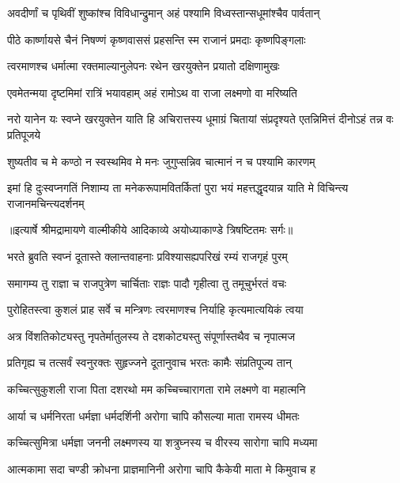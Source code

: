 \twolineshloka
{अवदीर्णां च पृथिवीं शुष्कांश्च विविधान्द्रुमान्}
{अहं पश्यामि विध्वस्तान्सधूमांश्चैव पार्वतान्} %

\twolineshloka
{पीठे कार्ष्णायसे चैनं निषण्णं कृष्णवाससं}
{प्रहसन्ति स्म राजानं प्रमदाः कृष्णपिङ्गलाः} %

\twolineshloka
{त्वरमाणश्च धर्मात्मा रक्तमाल्यानुलेपनः}
{रथेन खरयुक्तेन प्रयातो दक्षिणामुखः} %

\twolineshloka
{एवमेतन्मया दृष्टमिमां रात्रिं भयावहाम्}
{अहं रामोऽथ वा राजा लक्ष्मणो वा मरिष्यति} %

\threelineshloka
{नरो यानेन यः स्वप्ने खरयुक्तेन याति हि}
{अचिरात्तस्य धूमाग्रं चितायां संप्रदृश्यते}
{एतन्निमित्तं दीनोऽहं तन्न वः प्रतिपूजये} %

\twolineshloka
{शुष्यतीव च मे कण्ठो न स्वस्थमिव मे मनः}
{जुगुप्सन्निव चात्मानं न च पश्यामि कारणम्} %

\fourlineindentedshloka
{इमां हि दुःस्वप्नगतिं निशाम्य ता}
{मनेकरूपामवितर्कितां पुरा}
{भयं महत्तद्धृदयान्न याति मे}
{ विचिन्त्य राजानमचिन्त्यदर्शनम्} %


{॥इत्यार्षे श्रीमद्रामायणे वाल्मीकीये आदिकाव्ये अयोध्याकाण्डे त्रिषष्टितमः सर्गः॥}


\twolineshloka
{भरते ब्रुवति स्वप्नं दूतास्ते क्लान्तवाहनाः}
{प्रविश्यासह्यपरिखं रम्यं राजगृहं पुरम्} %

\twolineshloka
{समागम्य तु राज्ञा च राजपुत्रेण चार्चिताः}
{राज्ञः पादौ गृहीत्वा तु तमूचुर्भरतं वचः} %

\twolineshloka
{पुरोहितस्त्वा कुशलं प्राह सर्वे च मन्त्रिणः}
{त्वरमाणश्च निर्याहि कृत्यमात्ययिकं त्वया} %

\twolineshloka
{अत्र विंशतिकोट्यस्तु नृपतेर्मातुलस्य ते}
{दशकोट्यस्तु संपूर्णास्तथैव च नृपात्मज} %

\twolineshloka
{प्रतिगृह्य च तत्सर्वं स्वनुरक्तः सुहृज्जने}
{दूतानुवाच भरतः कामैः संप्रतिपूज्य तान्} %

\twolineshloka
{कच्चित्सुकुशली राजा पिता दशरथो मम}
{कच्चिच्चारागता रामे लक्ष्मणे वा महात्मनि} %

\twolineshloka
{आर्या च धर्मनिरता धर्मज्ञा धर्मदर्शिनी}
{अरोगा चापि कौसल्या माता रामस्य धीमतः} %

\twolineshloka
{कच्चित्सुमित्रा धर्मज्ञा जननी लक्ष्मणस्य या}
{शत्रुघ्नस्य च वीरस्य सारोगा चापि मध्यमा} %

\twolineshloka
{आत्मकामा सदा चण्डी क्रोधना प्राज्ञमानिनी}
{अरोगा चापि कैकेयी माता मे किमुवाच ह} %

